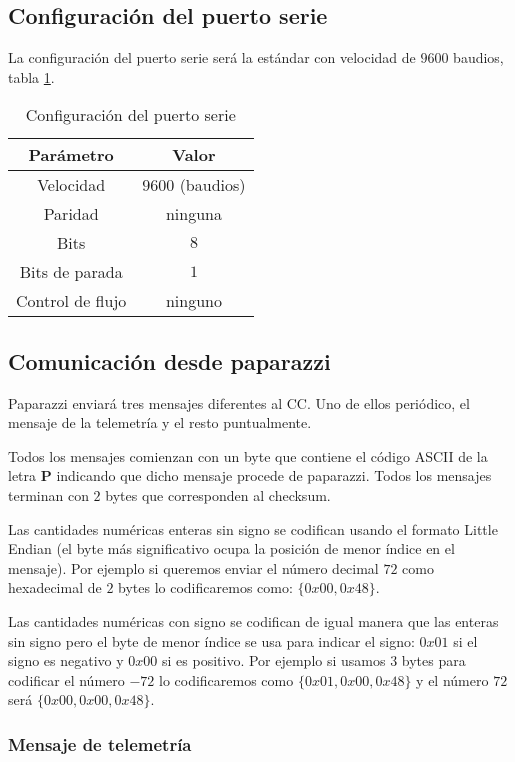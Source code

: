 \subsection{Configuración del puerto serie}

La configuración del puerto serie será la estándar con velocidad de $9600$ baudios, tabla \ref{tab:1}.
\begin{table}[h]
	\centering
	\caption{Configuración del puerto serie}
\begin{tabular}{|c|c|}
	\hline
	\textbf{Parámetro} & \textbf{Valor} \\ \hline \hline
	Velocidad  & $9600$ (baudios) \\\hline 
	Paridad & ninguna  \\ \hline
	Bits & $8$ \\ \hline 
	Bits de parada & $1$  \\ \hline
	Control de flujo & ninguno \\ \hline
\end{tabular}
\label{tab:1}
\end{table}


\subsection{Comunicación desde paparazzi}

Paparazzi enviará tres mensajes diferentes al CC. Uno de ellos periódico, el mensaje de la telemetría y el resto puntualmente.

Todos los mensajes comienzan con un byte que contiene el código ASCII de la letra \textbf{P} indicando que dicho mensaje procede de paparazzi. Todos los mensajes terminan con $2$ bytes que corresponden al checksum.

Las cantidades numéricas enteras sin signo se codifican usando el formato Little Endian (el byte más significativo ocupa la posición de menor índice en el mensaje). Por ejemplo si queremos enviar el número decimal $72$ como hexadecimal de $2$ bytes lo codificaremos como: $\{0x00,0x48\}$.

Las cantidades numéricas con signo se codifican de igual manera que las enteras sin signo pero el byte de menor índice se usa para indicar el signo: $0x01$ si el signo es negativo y $0x00$ si es positivo. Por ejemplo si usamos $3$ bytes para codificar el número $-72$ lo codificaremos como $\{0x01,0x00,0x48\}$ y el número $72$ será $\{0x00,0x00,0x48\}$.

\subsubsection{Mensaje de telemetría}

